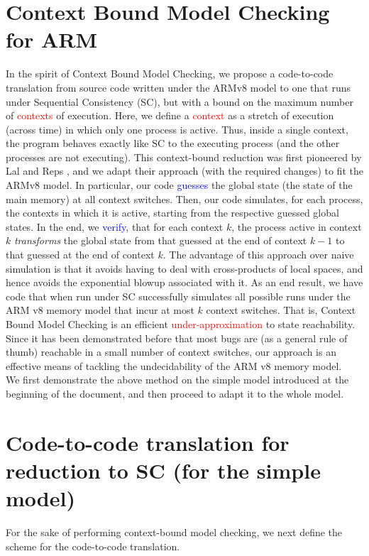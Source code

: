 \documentclass{article}
\begin{document}
\section{Context Bound Model Checking for ARM}
In the spirit of Context Bound Model Checking, we propose a code-to-code translation from source code written under the ARMv8 model to one that runs under Sequential Consistency (SC), but with a bound on the maximum number of \textcolor{red}{contexts} of execution. Here, we define a \textcolor{red}{context} as a stretch of execution (across time) in which only one process is active. Thus, inside a single context, the program behaves exactly like SC to the executing process (and the other processes are not executing). This context-bound reduction was first pioneered by Lal and Reps \cite{lalreps}, and we adapt their approach (with the required changes) to fit the ARMv8 model. In particular, our code \textcolor{blue}{guesses} the global state (the state of the main memory) at all context switches. Then, our code simulates, for each process, the contexts in which it is active, starting from the respective guessed global states. In the end, we \textcolor{blue}{verify}, that for each context $k$, the process active in context $k$ \textit{transforms} the global state from that guessed at the end of context $k-1$ to that guessed at the end of context $k$. The advantage of this approach over naive simulation is that it avoids having to deal with cross-products of local spaces, and hence avoids the exponential blowup associated with it. As an end result, we have code that when run under SC successfully simulates all possible runs under the ARM v8 memory model that incur at most $k$ context switches. That is, Context Bound Model Checking is an efficient \textcolor{red}{under-approximation} to state reachability. Since it has been demonstrated before that most bugs are (as a general rule of thumb) reachable in a small number of context switches, our approach is an effective means of tackling the undecidability of the ARM v8 memory model.\\
We first demonstrate the above method on the simple model introduced at the beginning of the document, and then proceed to adapt it to the whole model.
\section{Code-to-code translation for reduction to SC (for the simple model) }
For the sake of performing context-bound model checking, we next define the scheme for the code-to-code translation.
\end{document}
